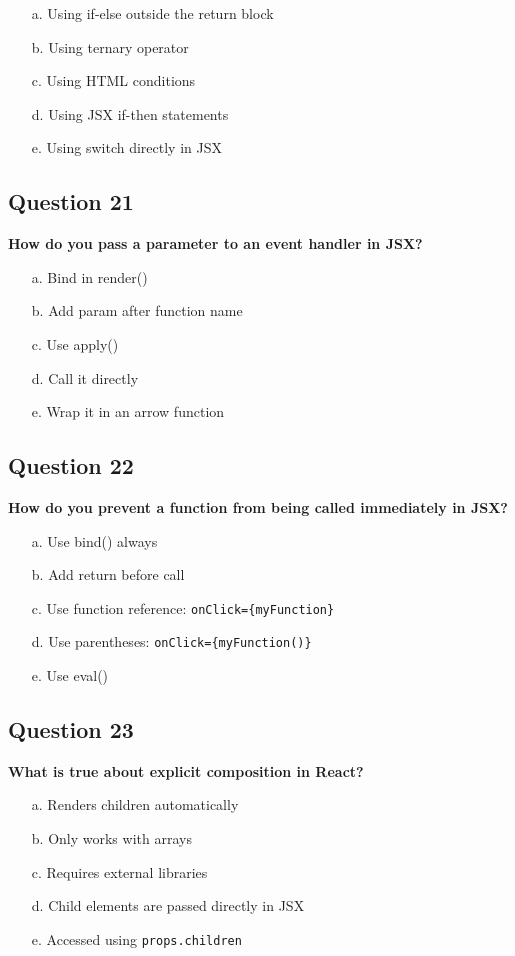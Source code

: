\documentclass{article}
\begin{document}
\begin{itemize}
  \item[a.] Using if-else outside the return block
  \item[b.] Using ternary operator
  \item[c.] Using HTML conditions
  \item[d.] Using JSX if-then statements
  \item[e.] Using switch directly in JSX
\end{itemize}

\subsection*{Question 21}
\textbf{How do you pass a parameter to an event handler in JSX?}

\begin{itemize}
  \item[a.] Bind in render()
  \item[b.] Add param after function name
  \item[c.] Use apply()
  \item[d.] Call it directly
  \item[e.] Wrap it in an arrow function
\end{itemize}

\subsection*{Question 22}
\textbf{How do you prevent a function from being called immediately in JSX?}

\begin{itemize}
  \item[a.] Use bind() always
  \item[b.] Add return before call
  \item[c.] Use function reference: \texttt{onClick=\{myFunction\}}
  \item[d.] Use parentheses: \texttt{onClick=\{myFunction()\}}
  \item[e.] Use eval()
\end{itemize}

\subsection*{Question 23}
\textbf{What is true about explicit composition in React?}

\begin{itemize}
  \item[a.] Renders children automatically
  \item[b.] Only works with arrays
  \item[c.] Requires external libraries
  \item[d.] Child elements are passed directly in JSX
  \item[e.] Accessed using \texttt{props.children}
\end{itemize}
\end{document}
